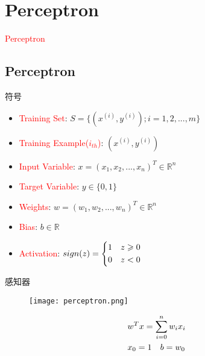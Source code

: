 \section{Perceptron}
\label{sec:perceptron}

\begin{frame}
  \begin{center}
    \Huge{\textcolor{red}{Perceptron}}
  \end{center}
\end{frame}

\subsection{Perceptron}

\begin{frame}[fragile]{符号}
 \begin{itemize}
   \item \textcolor{red}{Training Set}: $ S = \{ ({x^{(i)}},{y^{(i)}});i = 1,2,...,m\} $
   \item \textcolor{red}{Training Example($i_{th}$)}: $ ({x^{(i)}},{y^{(i)}}) $
   \item \textcolor{red}{Input Variable}: $ x = ({x_1},{x_2},...,{x_n})^{T} \in {\mathbb{R}^n} $
   \item \textcolor{red}{Target Variable}: $ y \in \{0,1\} $
   \item \textcolor{red}{Weights}: $ w = ({w_1},{w_2},...,{w_n})^{T} \in {\mathbb{R}^n} $   
   \item \textcolor{red}{Bias}: $ b \in \mathbb{R} $      
   \item \textcolor{red}{Activation}: $ 
sign(z)= \left\{ \begin{gathered}
  1 \quad z \geqslant 0 \hfill \\
  0 \quad z < 0 \hfill \\ 
\end{gathered}  \right.
$   
 \end{itemize}
\end{frame}

\begin{frame}{感知器}
  \begin{figure}
    \centering
    \texttt{[image: perceptron.png]}
  \end{figure}

\[\begin{gathered}
  {w^T}x = \sum\limits_{i = 0}^n {{w_i}{x_i}}  \hfill \\
  {x_0} = 1 \quad b = {w_0} \hfill \\ 
\end{gathered} \]
\end{frame}

